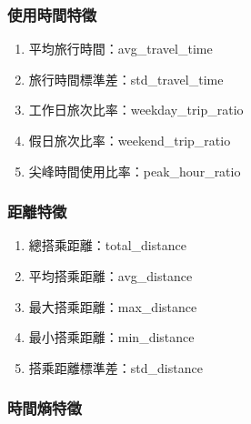 \subsubsection{使用時間特徵}\label{ux4f7fux7528ux6642ux9593ux7279ux5fb5}

\begin{enumerate}
\def\labelenumi{\arabic{enumi}.}
\tightlist
\item
  平均旅行時間：avg\_travel\_time
\item
  旅行時間標準差：std\_travel\_time
\item
  工作日旅次比率：weekday\_trip\_ratio
\item
  假日旅次比率：weekend\_trip\_ratio
\item
  尖峰時間使用比率：peak\_hour\_ratio
\end{enumerate}

\subsubsection{距離特徵}\label{ux8dddux96e2ux7279ux5fb5}

\begin{enumerate}
\def\labelenumi{\arabic{enumi}.}
\tightlist
\item
  總搭乘距離：total\_distance
\item
  平均搭乘距離：avg\_distance
\item
  最大搭乘距離：max\_distance
\item
  最小搭乘距離：min\_distance
\item
  搭乘距離標準差：std\_distance
\end{enumerate}

\subsubsection{時間熵特徵}\label{ux6642ux9593ux71b5ux7279ux5fb5}


